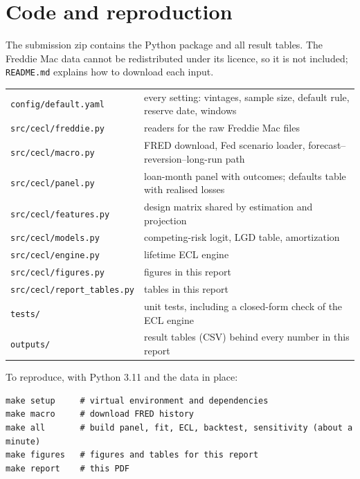\documentclass[11pt]{article}
\begin{document}
\appendix
\section{Code and reproduction}
The submission zip contains the Python package and all result tables. The Freddie Mac data cannot be redistributed under
its licence, so it is not included; \texttt{README.md} explains how to download each input.

\begin{tabular}{@{}lp{}@{}}
\texttt{config/default.yaml} & every setting: vintages, sample size, default rule, reserve date, windows \\
\texttt{src/cecl/freddie.py} & readers for the raw Freddie Mac files \\
\texttt{src/cecl/macro.py} & FRED download, Fed scenario loader, forecast--reversion--long-run path \\
\texttt{src/cecl/panel.py} & loan-month panel with outcomes; defaults table with realised losses \\
\texttt{src/cecl/features.py} & design matrix shared by estimation and projection \\
\texttt{src/cecl/models.py} & competing-risk logit, LGD table, amortization \\
\texttt{src/cecl/engine.py} & lifetime ECL engine \\
\texttt{src/cecl/figures.py} & figures in this report \\
\texttt{src/cecl/report\_tables.py} & tables in this report \\
\texttt{tests/} & unit tests, including a closed-form check of the ECL engine \\
\texttt{outputs/} & result tables (CSV) behind every number in this report \\
\end{tabular}

To reproduce, with Python 3.11 and the data in place:
\begin{verbatim}
make setup     # virtual environment and dependencies
make macro     # download FRED history
make all       # build panel, fit, ECL, backtest, sensitivity (about a minute)
make figures   # figures and tables for this report
make report    # this PDF
\end{verbatim}
\end{document}
